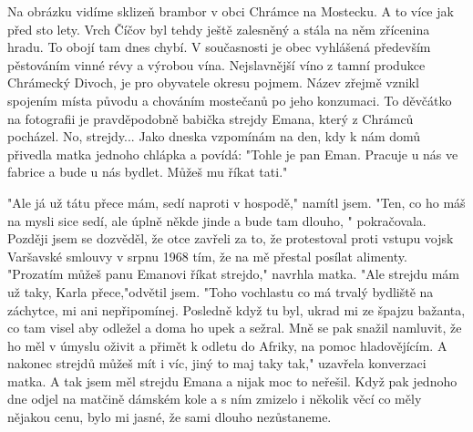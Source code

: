 
Na obrázku vidíme sklizeň brambor v obci Chrámce na Mostecku. A to
více jak před sto lety. Vrch Číčov byl tehdy ještě zalesněný a stála
na něm zřícenina hradu. To obojí tam dnes chybí. V současnosti je obec
vyhlášená především pěstováním vinné révy a výrobou vína. Nejslavnější
víno z tamní produkce Chrámecký Divoch, je pro obyvatele okresu
pojmem. Název zřejmě vznikl spojením místa původu a chováním mostečanů
po jeho konzumaci. To děvčátko na fotografii je pravděpodobně babička
strejdy Emana, který z Chrámců pocházel. No, strejdy... Jako dneska
vzpomínám na den, kdy k nám domů přivedla matka jednoho chlápka a
povídá: "Tohle je pan Eman. Pracuje u nás ve fabrice a bude u nás
bydlet. Můžeš mu říkat tati."

"Ale já už tátu přece mám, sedí naproti v hospodě," namítl jsem. "Ten,
co ho máš na mysli sice sedí, ale úplně někde jinde a bude tam dlouho,
" pokračovala. Později jsem se dozvěděl, že otce zavřeli za to, že
protestoval proti vstupu vojsk Varšavské smlouvy v srpnu 1968 tím, že
na mě přestal posílat alimenty. "Prozatím můžeš panu Emanovi říkat
strejdo," navrhla matka. "Ale strejdu mám už taky, Karla
přece,"odvětil jsem. "Toho vochlastu co má trvalý bydliště na
záchytce, mi ani nepřipomínej. Posledně když tu byl, ukrad mi ze
špajzu bažanta, co tam visel aby odležel a doma ho upek a sežral. Mně
se pak snažil namluvit, že ho měl v úmyslu oživit a přimět k odletu do
Afriky, na pomoc hladovějícím. A nakonec strejdů můžeš mít i víc, jiný
to maj taky tak," uzavřela konverzaci matka. A tak jsem měl strejdu
Emana a nijak moc to neřešil. Když pak jednoho dne odjel na matčině
dámském kole a s ním zmizelo i několik věcí co měly nějakou cenu, bylo
mi jasné, že sami dlouho nezůstaneme.
